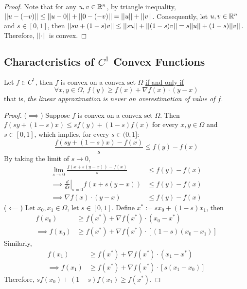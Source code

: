 \documentclass{article}
\begin{document}
    \begin{proof}
    	Note that for any $u, v \in \mathbb{R}^n$, by triangle inequality, $\vert \vert {u - (-v)} \vert \vert \leq \vert \vert {u - 0} \vert \vert + \vert \vert {0 - (-v)} \vert \vert = \vert \vert {u} \vert \vert + \vert \vert {v} \vert \vert$. Consequently, let $u, v \in \mathbb{R}^n$ and $s \in [0, 1]$, then $\vert \vert {s u + (1-s) v} \vert \vert \leq \vert \vert {su} \vert \vert + \vert \vert {(1-s) v} \vert \vert = s \vert \vert {u} \vert \vert + (1-s) \vert \vert {v} \vert \vert$. Therefore, $\vert \vert {\cdot} \vert \vert$ is convex.
    \end{proof}
	
	\subsection{Characteristics of $C^1$ Convex Functions}
	
    \begin{theorem}
        Let $f \in C^1$, then $f$ is convex on a convex set $\Omega$ \ul{if and only if}
        \begin{equation}
            \forall x, y \in \Omega,\ f(y) \geq f(x) + \nabla f(x) \cdot (y - x)
        \end{equation}
        that is, \emph{the linear approximation is never an overestimation of value of $f$}.
    \end{theorem}
    \begin{proof}
        ($\implies$) Suppose $f$ is convex on a convex set $\Omega$. Then $f(sy + (1-s) x) \leq sf(y) + (1-s)f(x)$ for every $x, y \in \Omega$ and $s \in [0, 1]$, which implies, for every $s \in (0, 1]$:
        \begin{equation}
            \frac{f(sy + (1-s) x) - f(x)}{s} \leq f(y) - f(x)
        \end{equation}
        By taking the limit of $s \to 0$,
        \begin{align}
            \lim_{s \to 0} \frac{f(x + s(y-x)) - f(x)}{s} &\leq f(y) - f(x) \\
            \implies \left.\frac{d}{ds}\right\vert_{s=0} f(x + s(y-x)) &\leq f(y) - f(x) \\
            \implies \nabla f(x) \cdot (y-x) &\leq f(y) - f(x)
        \end{align}
        ($\impliedby$) Let $x_0, x_1 \in \Omega$, let $s \in [0, 1]$. Define $x^* := s x_0 + (1-s) x_1$, then 
        \begin{align}
        	f(x_0) &\geq f(x^*) + \nabla f(x^*) \cdot (x_0 - x^*) \\
        	\implies f(x_0) &\geq f(x^*) + \nabla f(x^*) \cdot [(1-s)(x_0 - x_1)]
        \end{align}
        Similarly,
        \begin{align}
        	f(x_1) &\geq f(x^*) + \nabla f(x^*) \cdot (x_1 - x^*) \\
        	\implies f(x_1) &\geq f(x^*) + \nabla f(x^*) \cdot [s(x_1 - x_0)]
        \end{align}
        Therefore, $sf(x_0) + (1-s)f(x_1) \geq f(x^*)$.
    \end{proof}
    
\end{document}
